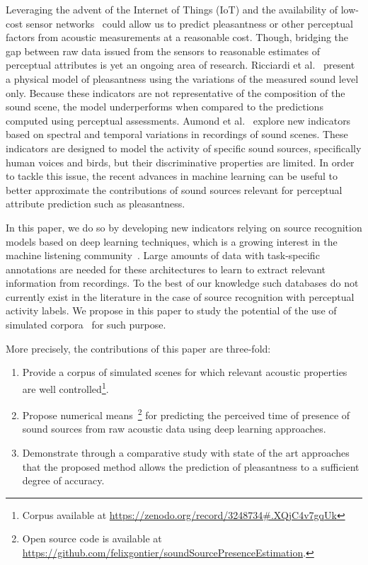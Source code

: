\documentclass[twocolumn]{article}
\begin{document}
Leveraging the advent of the Internet of Things (IoT) and the availability of low-cost sensor networks~\cite{ardouin2018, mydlarz2017} could allow us to predict pleasantness or other perceptual factors from acoustic measurements at a reasonable cost. Though, bridging the gap between raw data issued from the sensors to reasonable estimates of perceptual attributes is yet an ongoing area of research. Ricciardi et al.~\cite{ricciardi2014} present a physical model of pleasantness using the variations of the measured sound level only. Because these indicators are not representative of the composition of the sound scene, the model underperforms when compared to the predictions computed using perceptual assessments. Aumond et al.~\cite{aumond2017} explore new indicators based on spectral and temporal variations in recordings of sound scenes. These indicators are designed to model the activity of specific sound sources, specifically human voices and birds, but their discriminative properties are limited. In order to tackle this issue, the recent advances in machine learning can be useful to better approximate the contributions of sound sources relevant for perceptual attribute prediction such as pleasantness.

In this paper, we do so by developing new indicators relying on source recognition models based on deep learning techniques, which is a growing interest in the machine listening community~\cite{cakir2015, salamon2017-2}. Large amounts of data with task-specific annotations are needed for these architectures to learn to extract relevant information from recordings. To the best of our knowledge such databases do not currently exist in the literature in the case of source recognition with perceptual activity labels. We propose in this paper to study the potential of the use of simulated corpora~\cite{lafay2016, salamon2017} for such purpose.

More precisely, the contributions of this paper are three-fold:
\begin{enumerate}
  \item Provide a corpus of simulated scenes for which relevant acoustic properties are well controlled\footnote{Corpus available at \url{https://zenodo.org/record/3248734\#.XQjC4v7gqUk}}.
  \item Propose numerical means~\footnote{Open source code is available at \url{https://github.com/felixgontier/soundSourcePresenceEstimation}.} for predicting the perceived time of presence of sound sources from raw acoustic data using deep learning approaches.
  \item Demonstrate through a comparative study with state of the art approaches that the proposed method allows the prediction of pleasantness to a sufficient degree of accuracy.
\end{enumerate}
\end{document}
